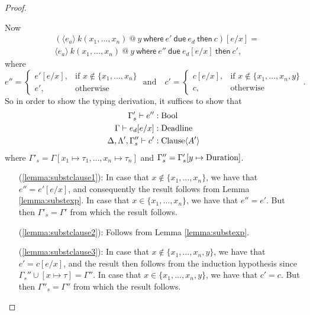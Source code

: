 \documentclass[orivec,final]{llncs-href}
\makeatletter
\newcommand{\type}{\tau}
\newcommand{\catomic}[6]{\langle#1\rangle\ #2\ \textsf{@}\ #3\
  \mathsf{where}\ #4\ \mathsf{due}\ #5\ \mathsf{then}\ #6}
\makeatother
\begin{document}
\begin{proof}
\begin{itemize}[]
    Now
    \begin{align*}
      &(\catomic{e_a}{k(x_1,\ldots,x_n)}{y}{e'}{e_d}{c})[e/x] =\\
      &\catomic{e_a}{k(x_1,\ldots,x_n)}{y}{e''}{e_d[e/x]}{c'},
    \end{align*}
    where
    \[
    e'' = \left\{ \begin{array}{ll} 
        e'[e/x], & \mbox{if } x \not\in \{x_1,\ldots,x_n\}\\
        e', & \mbox{otherwise}
      \end{array} \right. \mbox{ and}\quad
    c' = \left\{ \begin{array}{ll}
        c[e/x], & \mbox{if } x \not\in \{x_1,\ldots,x_n,y\}\\
        c, & \mbox{otherwise}
      \end{array} \right. .
    \]
    So in order to show the typing derivation, it suffices to show that
    \begin{align}
      \Gamma'_s \vdash e''& : \mathrm{Bool} \label{lemma:substclause1}\\
      \Gamma \vdash e_d[e/x]& : \mathrm{Deadline} \label{lemma:substclause2}\\
      \Delta,\Lambda',\Gamma''_s \vdash c'& : \mathrm{Clause} \langle A' \rangle \label{lemma:substclause3}
    \end{align}
    where $\Gamma'_s = \Gamma[x_1 \mapsto \type_1, \ldots, x_n \mapsto
    \type_n]$ and $\Gamma''_s = \Gamma'_s[y \mapsto \mathrm{Duration}]$.
    \begin{itemize}
    \item[(\ref{lemma:substclause1}):]
      In case that $x \not\in \{x_1,\ldots,x_n\}$, we have that $e'' =
      e'[e/x]$, and consequently the result follows from Lemma
      \ref{lemma:substexp}. In case that $x \in \{x_1,\ldots,x_n\}$,
      we have that $e'' = e'$. But then $\Gamma'_s = \Gamma'$ from
      which the result follows.
    \item[(\ref{lemma:substclause2}):]
      Follows from Lemma \ref{lemma:substexp}.
    \item[(\ref{lemma:substclause3}):]
      In case that $x \not\in \{x_1,\ldots,x_n,y\}$, we have that $c'
      = c[e/x]$, and the result then follows from the induction
      hypothesis since $\Gamma_s'' \cup [x \mapsto \type] = \Gamma''$. In case that $x \in \{x_1,\ldots,x_n,y\}$, we have
      that $c' = c$. But then $\Gamma''_s = \Gamma''$ from
      which the result follows.
    \end{itemize}


\end{itemize}
\end{proof}
\end{document}
